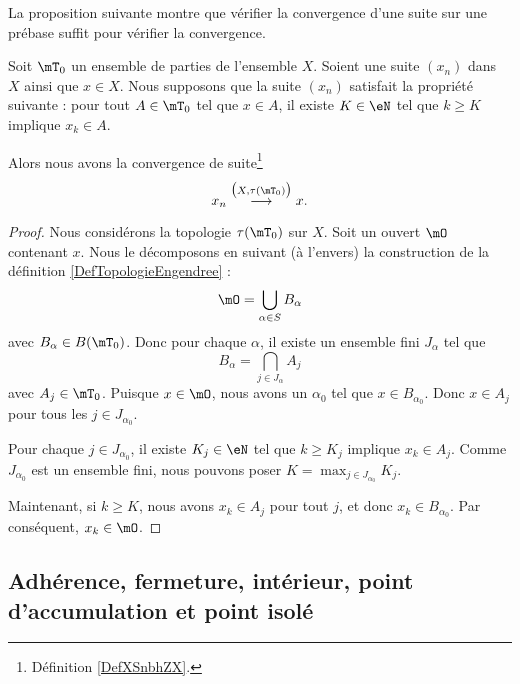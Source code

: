 La proposition suivante montre que vérifier la convergence d'une suite sur une prébase suffit pour vérifier la convergence.
\begin{proposition}     \label{PROPooJTJBooNtczsO}
	Soit \( \mT_0\) un ensemble de parties de l'ensemble \( X\). Soient une suite \( (x_n)\) dans \( X\) ainsi que \( x\in X\). Nous supposons que la suite \( (x_n)\) satisfait la propriété suivante : pour tout \( A\in \mT_0\) tel que \( x\in A\), il existe \( K\in \eN\) tel que \( k\geq K\) implique \( x_k\in A\).

	Alors nous avons la convergence de suite\footnote{Définition \ref{DefXSnbhZX}.}
	\begin{equation}
		x_n\stackrel{\big( X,\tau(\mT_0) \big)}{\longrightarrow}x.
	\end{equation}
\end{proposition}

\begin{proof}
	Nous considérons la topologie \( \tau(\mT_0)\) sur \( X\). Soit un ouvert \( \mO\) contenant \( x\). Nous le décomposons en suivant (à l'envers) la construction de la définition \ref{DefTopologieEngendree} :
	\begin{equation}
		\mO=\bigcup_{\alpha\in S}B_{\alpha}
	\end{equation}
	avec \( B_{\alpha}\in B(\mT_0)\). Donc pour chaque \( \alpha\), il existe un ensemble fini \( J_{\alpha}\) tel que
	\begin{equation}
		B_{\alpha}=\bigcap_{j\in J_{\alpha}}A_j
	\end{equation}
	avec \( A_j\in \mT_0\). Puisque \( x\in \mO\), nous avons un \( \alpha_0\) tel que \( x\in B_{\alpha_0}\). Donc \( x\in A_j\) pour tous les \( j\in J_{\alpha_0}\).

	Pour chaque \( j\in J_{\alpha_0}\), il existe \( K_j\in \eN\) tel que \( k\geq K_j\) implique \( x_k\in A_j\). Comme \( J_{\alpha_0}\) est un ensemble fini, nous pouvons poser \( K=\max_{j\in J_{\alpha_0}}K_j\).

	Maintenant, si \( k\geq K\), nous avons \( x_k\in A_j\) pour tout \( j\), et donc \( x_k\in B_{\alpha_0}\). Par conséquent, \( x_k\in \mO\).
\end{proof}



\subsection{Adhérence, fermeture, intérieur, point d'accumulation et point isolé}

